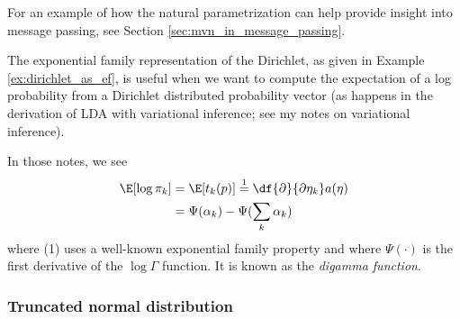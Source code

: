 \documentclass{article} %
\begin{document}
For an example of how the natural parametrization can help provide insight into message passing,  see Section \ref{sec:mvn_in_message_passing}.

\begin{remark} The exponential family representation of the Dirichlet, as given in Example \ref{ex:dirichlet_as_ef}, is useful when we want to compute the expectation of a log probability from a Dirichlet distributed probability vector (as happens in the derivation of LDA with variational inference; see my notes on variational inference).  

In those notes,  we see
\begin{align} 
\E [ \log \pi_k] &= \E [t_k(p)] \stackrel{1}{=} \df{\partial}{\partial \eta_k} a(\eta) \nonumber \\
&=\Psi(\alpha_k) -  \Psi(\sum_k  \alpha_k) \label{eqn:expectation_of_log_probability} 
\end{align}
where (1) uses a well-known exponential family property and where $\Psi(\cdot)$ is the first derivative of the $\log \Gamma$ function.   It is known as the \textit{digamma function}.  $ $

\end{remark}

\subsubsection{Truncated normal distribution}
\end{document}
